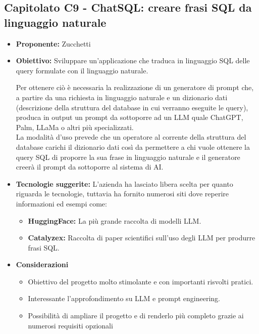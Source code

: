 \documentclass{article}
\begin{document}

\subsection{\textbf{Capitolato C9} - ChatSQL: creare frasi SQL da linguaggio naturale}
\begin{itemize}
    \item[] \textbf{Proponente:} Zucchetti
    
    \item[] \textbf{Obiettivo:} Sviluppare un’applicazione che traduca in linguaggio SQL delle query formulate con il linguaggio naturale.
    
    Per ottenere ciò è necessaria la realizzazione di un generatore di prompt che, a partire da una richiesta in linguaggio naturale e un dizionario dati (descrizione della struttura del database in cui verranno eseguite le query), produca in output un prompt da sottoporre ad un LLM quale ChatGPT, Palm, LLaMa o altri più specializzati. \\
    La modalità d’uso prevede che un operatore al corrente della  struttura del database carichi il dizionario dati così da permettere a chi vuole ottenere la query SQL di proporre la sua frase in linguaggio naturale e il generatore  creerà il prompt da sottoporre al sistema di AI.
    
    \item[] \textbf{Tecnologie suggerite:} L’azienda ha lasciato libera scelta per quanto riguarda le tecnologie, tuttavia ha fornito numerosi siti dove reperire informazioni ed esempi come:
    \begin{itemize}
        \item \textbf{HuggingFace:} La più grande raccolta di modelli LLM.
        \item \textbf{Catalyzex:} Raccolta di paper scientifici sull'uso degli LLM per produrre frasi SQL.
    \end{itemize}
    
    \item[] \textbf{Considerazioni}
    \begin{itemize}
        \item Obiettivo del progetto molto stimolante e con importanti risvolti pratici.
        \item Interessante l’approfondimento su LLM e prompt engineering.
        \item Possibilità di ampliare il progetto e di renderlo più completo grazie ai numerosi requisiti opzionali
    \end{itemize} 

\end{itemize}
\pagebreak
\end{document}
